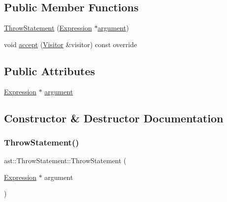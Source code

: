 \subsection*{Public Member Functions}
\begin{DoxyCompactItemize}
\item 
\hyperlink{structast_1_1_throw_statement_a01774fa8f985fcef5c882f85b984f988}{Throw\+Statement} (\hyperlink{structast_1_1_expression}{Expression} $\ast$\hyperlink{structast_1_1_throw_statement_ad481e5ceab6c253642c489346dde3281}{argument})
\item 
void \hyperlink{structast_1_1_throw_statement_ae653fa62092ea18ce6c16eee1018aa4d}{accept} (\hyperlink{structast_1_1_visitor}{Visitor} \&visitor) const override
\end{DoxyCompactItemize}
\subsection*{Public Attributes}
\begin{DoxyCompactItemize}
\item 
\hyperlink{structast_1_1_expression}{Expression} $\ast$ \hyperlink{structast_1_1_throw_statement_ad481e5ceab6c253642c489346dde3281}{argument}
\end{DoxyCompactItemize}


\subsection{Constructor \& Destructor Documentation}
\mbox{\label{structast_1_1_throw_statement_a01774fa8f985fcef5c882f85b984f988}} 
\subsubsection{\texorpdfstring{Throw\+Statement()}{ThrowStatement()}}
{\footnotesize\ttfamily ast\+::\+Throw\+Statement\+::\+Throw\+Statement (\begin{DoxyParamCaption}\item[{\hyperlink{structast_1_1_expression}{Expression} $\ast$}]{argument }\end{DoxyParamCaption})\hspace{0.3cm}{\ttfamily [inline]}}



